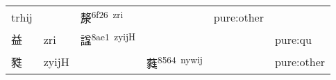 \documentclass[14pt,a4paper]{scrartcl}
\begin{document}
\begin{longtable}[c]{@{}llllll@{}}
\begin{minipage}[t]{0.14\columnwidth}\raggedright\strut
trhij
\strut\end{minipage} &
\begin{minipage}[t]{0.14\columnwidth}\raggedright\strut
\strut\end{minipage} &
\begin{minipage}[t]{0.14\columnwidth}\raggedright\strut
漦\textsuperscript{6f26~zri}
\strut\end{minipage} &
\begin{minipage}[t]{0.14\columnwidth}\raggedright\strut
\strut\end{minipage} &
\begin{minipage}[t]{0.14\columnwidth}\raggedright\strut
pure:other
\strut\end{minipage}\tabularnewline
\begin{minipage}[t]{0.14\columnwidth}\raggedright\strut
益
\strut\end{minipage} &
\begin{minipage}[t]{0.14\columnwidth}\raggedright\strut
zri
\strut\end{minipage} &
\begin{minipage}[t]{0.14\columnwidth}\raggedright\strut
諡\textsuperscript{8ae1~zyijH}
\strut\end{minipage} &
\begin{minipage}[t]{0.14\columnwidth}\raggedright\strut
\strut\end{minipage} &
\begin{minipage}[t]{0.14\columnwidth}\raggedright\strut
\strut\end{minipage} &
\begin{minipage}[t]{0.14\columnwidth}\raggedright\strut
pure:qu
\strut\end{minipage}\tabularnewline
\begin{minipage}[t]{0.14\columnwidth}\raggedright\strut
甤
\strut\end{minipage} &
\begin{minipage}[t]{0.14\columnwidth}\raggedright\strut
zyijH
\strut\end{minipage} &
\begin{minipage}[t]{0.14\columnwidth}\raggedright\strut
\strut\end{minipage} &
\begin{minipage}[t]{0.14\columnwidth}\raggedright\strut
蕤\textsuperscript{8564~nywij}
\strut\end{minipage} &
\begin{minipage}[t]{0.14\columnwidth}\raggedright\strut
\strut\end{minipage} &
\begin{minipage}[t]{0.14\columnwidth}\raggedright\strut
pure:other
\strut\end{minipage}\tabularnewline
\bottomrule
\end{longtable}
\end{document}
